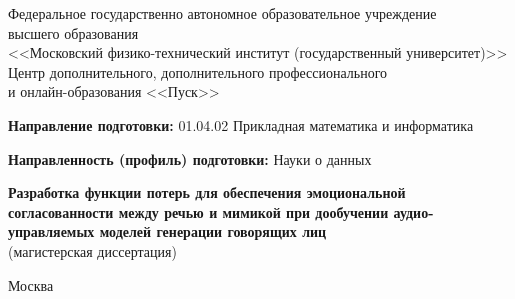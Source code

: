\documentclass[a4paper, 12pt, oneside, openany]{article}
\begin{document}
\begin{titlepage} %
\begin{center} %
Федеральное государственно автономное образовательное учреждение\\ высшего образования\\
<<Московский физико-технический институт (государственный университет)>>\\
Центр дополнительного, дополнительного профессионального\\и онлайн-образования <<Пуск>>\\ [2cm]
\end{center} %
\par
\textbf{Направление подготовки:} 01.04.02 Прикладная математика и информатика

\textbf{Направленность (профиль) подготовки:} Науки о данных

\vspace{2cm}

\begin{center} %
{\huge\textbf{Разработка функции потерь для обеспечения эмоциональной согласованности между речью и мимикой при дообучении аудио-управляемых моделей генерации говорящих лиц}}\\
(магистерская диссертация)\\[2cm]
\end{center} %
\vfill %
\begin{center}{Москва \the\year}\end{center} %
\thispagestyle{empty} %
\end{titlepage} %
\end{document}
